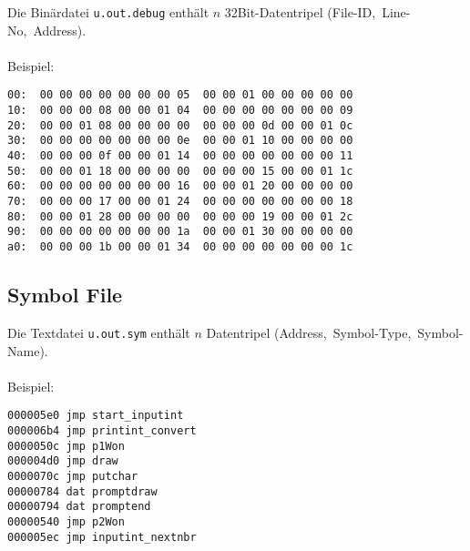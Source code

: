 \begin{frame}[fragile]{\insertsubsection}
    Die Binärdatei \texttt{u.out.debug} enthält $n$ 32Bit-Datentripel
    (File-ID,~Line-No,~Address).
    \\~\\
    Beispiel:
\begin{verbatim}
00:  00 00 00 00 00 00 00 05  00 00 01 00 00 00 00 00
10:  00 00 00 08 00 00 01 04  00 00 00 00 00 00 00 09
20:  00 00 01 08 00 00 00 00  00 00 00 0d 00 00 01 0c
30:  00 00 00 00 00 00 00 0e  00 00 01 10 00 00 00 00
40:  00 00 00 0f 00 00 01 14  00 00 00 00 00 00 00 11
50:  00 00 01 18 00 00 00 00  00 00 00 15 00 00 01 1c
60:  00 00 00 00 00 00 00 16  00 00 01 20 00 00 00 00
70:  00 00 00 17 00 00 01 24  00 00 00 00 00 00 00 18
80:  00 00 01 28 00 00 00 00  00 00 00 19 00 00 01 2c
90:  00 00 00 00 00 00 00 1a  00 00 01 30 00 00 00 00
a0:  00 00 00 1b 00 00 01 34  00 00 00 00 00 00 00 1c
\end{verbatim}
\end{frame}

\subsection{Symbol File}

\begin{frame}[fragile]{\insertsubsection}
    Die Textdatei \texttt{u.out.sym} enthält $n$ Datentripel (Address,~Symbol-Type,~Symbol-Name).
    \\~\\
    Beispiel:
\begin{verbatim}
000005e0 jmp start_inputint
000006b4 jmp printint_convert
0000050c jmp p1Won
000004d0 jmp draw
0000070c jmp putchar
00000784 dat promptdraw
00000794 dat promptend
00000540 jmp p2Won
000005ec jmp inputint_nextnbr
\end{verbatim}
\end{frame}
